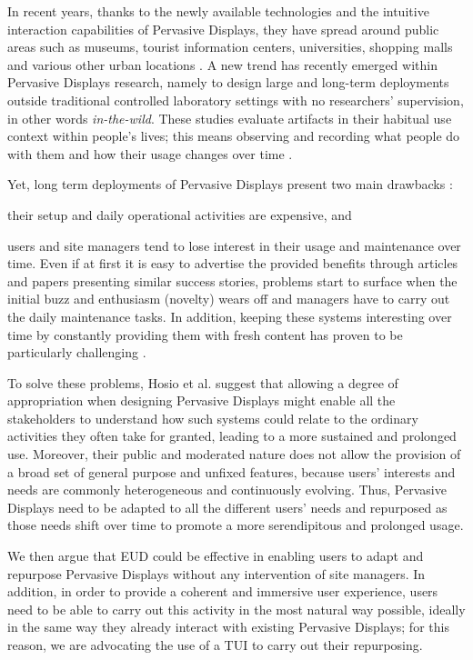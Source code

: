 In recent years, thanks to the newly available technologies and the intuitive interaction capabilities of Pervasive Displays, they have spread around public areas such as museums, tourist information centers, universities, shopping malls and various other urban locations \cite{Bellucci:2014jj,Ardito:2015gq}. A new trend has recently emerged within Pervasive Displays research, namely to design large and long-term deployments outside traditional controlled laboratory settings with no researchers' supervision, in other words \emph{in-the-wild}. These studies evaluate artifacts in their habitual use context within people's lives; this means observing and recording what people do with them and how their usage changes over time \cite{Crabtree:2013coba}.

Yet, long term deployments of Pervasive Displays present two main drawbacks \cite{RealWorld}:
\begin{enumerate*}[label=(\arabic*)]
	\item their setup and daily operational activities are expensive, and
	\item users and site managers tend to lose interest in their usage and maintenance over time. Even if at first it is easy to advertise the provided benefits through articles and papers presenting similar success stories, problems start to surface when the initial buzz and enthusiasm (novelty) wears off and managers have to carry out the daily maintenance tasks. In addition, keeping these systems interesting over time by constantly providing them with fresh content has proven to be particularly challenging \cite{Memarovic:2013:PLF:2491500.2491505}.
\end{enumerate*}

To solve these problems, Hosio et al. \cite{RealWorld} suggest that allowing a degree of appropriation when designing Pervasive Displays might enable all the stakeholders to understand how such systems could relate to the ordinary activities they often take for granted, leading to a more sustained and prolonged use. Moreover, their public and moderated nature does not allow the provision of a broad set of general purpose and unfixed features, because users' interests and needs are commonly heterogeneous and continuously evolving. Thus, Pervasive Displays need to be adapted to all the different users' needs and repurposed as those needs shift over time to promote a more serendipitous and prolonged usage.

We then argue that \ac{EUD} could be effective in enabling users to adapt and repurpose Pervasive Displays without any intervention of site managers. In addition, in order to provide a coherent and immersive user experience, users need to be able to carry out this activity in the most natural way possible, ideally in the same way they already interact with existing Pervasive Displays; for this reason, we are advocating the use of a \ac{TUI} to carry out their repurposing.

